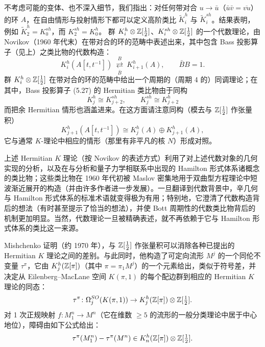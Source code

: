 不考虑可能的变体、也不深入细节，我们指出：对任何带对合 $u\to\bar u$（$\bar u\bar v=\overline{vu}$）的环 $A$，在自由情形与投射情形下都可以定义高阶类比 $\tilde K_{i}^{h}$ 与 $\tilde K_{i}^{sh}$。结果表明，例如 $\tilde K_{2}^{h}=K_{0}^{sh}$，而 $K_{2}^{sh}=K_{0}^{h}$。%
群 $K_{i}^{h}\otimes\mathbb{Z}[\tfrac12]$、$K_{i}^{sh}\otimes\mathbb{Z}[\tfrac12]$ 的一个代数理论，由 Novikov（1960 年代末）在带对合的环的范畴中表述出来，其中包含 Bass 投影算子（见上）之类比物的代数构造：
\begin{equation}
K_{i}^{h}(A[t,t^{-1}])\ \underset{\bar B}{\overset{B}{\rightleftarrows}}\ K_{i+1}^{h}(A),\qquad \bar BB=1. \tag{5.27}
\end{equation}
群 $K_{i}^{h}\otimes\mathbb{Z}[\tfrac12]$ 在带对合的环的范畴中给出一个周期的（周期 4 的）同调理论；在其中，Bass 投影算子 (5.27) 的 Hermitian 类比物由于同构
\begin{equation}
K_{j}^{h}\cong K_{j+2}^{sh},\qquad K_{j}^{sh}\cong K_{j+2}^{h} \tag{5.28}
\end{equation}
而把余 Hermitian 情形也涵盖进来。在这方面请注意同构（模去与 $\mathbb{Z}[\tfrac12]$ 作张量积）
\begin{equation}
K_{j+1}^{h}(A[t,t^{-1}])\cong K_{j}^{h}(A)\oplus K_{j+1}^{h}(A), \tag{5.29}
\end{equation}
它与通常 $K$-理论中相应的情形（那里有非平凡的核 $N$）形成对照。

上述 Hermitian $K$ 理论（按 Novikov 的表述方式）利用了对上述代数对象的几何实现的分析，以及在与分析和量子力学相联系中出现的 Hamilton 形式体系诸概念的类比物；这些类比物在 1960 年代初被 Maslov 密集地用于双曲型方程理论中短波渐近展开的构造（并由许多作者进一步发展）。一旦翻译到代数背景中，辛几何与 Hamilton 形式体系的标准术语就变得极为有用；特别地，它澄清了代数构造背后的想法（有时甚至提示了恰当的想法），并使 Bott 周期性的代数类比物背后的机制更加明显。当然，代数理论一旦被精确表述，就不再依赖于它与 Hamilton 形式体系的类比这一来源。

Mishchenko 证明（约 1970 年），与 $\mathbb{Z}[\tfrac12]$ 作张量积可以消除各种已提出的 Hermitian $K$ 理论之间的差别。与此同时，他构造了可定向流形 $M^{j}$ 的一个同伦不变量 $\tau^{\pi}$，它由 $K_{j}^{h}(\mathbb{Z}[\pi])$（其中 $\pi=\pi_{1}M^{j}$）的一个元素给出，类似于符号差，并决定从 Eilenberg--MacLane 空间 $K(\pi,1)$ 的每个配边群到相应的 Hermitian $K$ 理论的同态：
\[
\tau^{\pi}\colon\Omega_{j}^{SO}(K(\pi,1))\to K_{j}^{h}(\mathbb{Z}[\pi])\otimes\mathbb{Z}[\tfrac12].
\]
对 1 次正规映射 $f\colon M_{1}^{n}\to M^{n}$（它在维数 $\ge 5$ 的流形的一般分类理论中居于中心地位），障碍由如下公式给出：
\[
\tau^{\pi}(M_{1}^{n})-\tau^{\pi}(M^{n})\in K_{n}^{h}(\mathbb{Z}[\pi])\otimes\mathbb{Z}[\tfrac12].
\]

